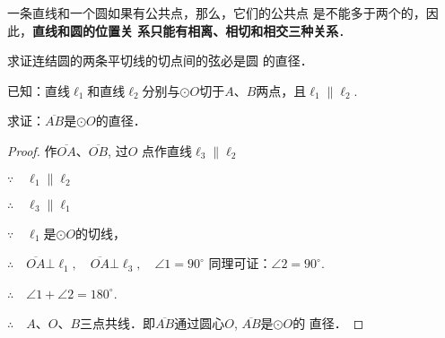 一条直线和一个圆如果有公共点，那么，它们的公共点
是不能多于两个的，因此，\textbf{直线和圆的位置关
系只能有相离、相切和相交三种关系}．





\begin{example}
    求证连结圆的两条平切线的切点间的弦必是圆
的直径．

已知：直线$\ell_1$和直线$\ell_2$分别与$\odot O$切于$A$、$B$两点，且$\ell_1\parallel \ell_2$.

求证：$\overline{AB}$是$\odot O$的直径．
\end{example}

\begin{figure}[htp]
    \centering
{}
    \caption{}
\end{figure}

\begin{proof}
    作$\overline{OA}$、$\overline{OB}$, 过$O$
点作直线$\ell_3\parallel \ell_2$

$\because\quad \ell_1\parallel \ell_2$

$\therefore\quad \ell_3\parallel \ell_1$

$\because\quad \ell_1$是$\odot O$的切线，

$\therefore\quad \overline{OA}\bot \ell_1,\quad \overline{OA}\bot \ell_3,\quad \angle 1=90^{\circ}$
同理可证：$\angle 2=90^{\circ}$.

$\therefore\quad \angle 1+\angle 2=180^{\circ}$.

$\therefore\quad A$、$O$、$B$三点共线．即$\overline{AB}$通过圆心$O$, $\overline{AB}$是$\odot O$的
直径．
\end{proof}


